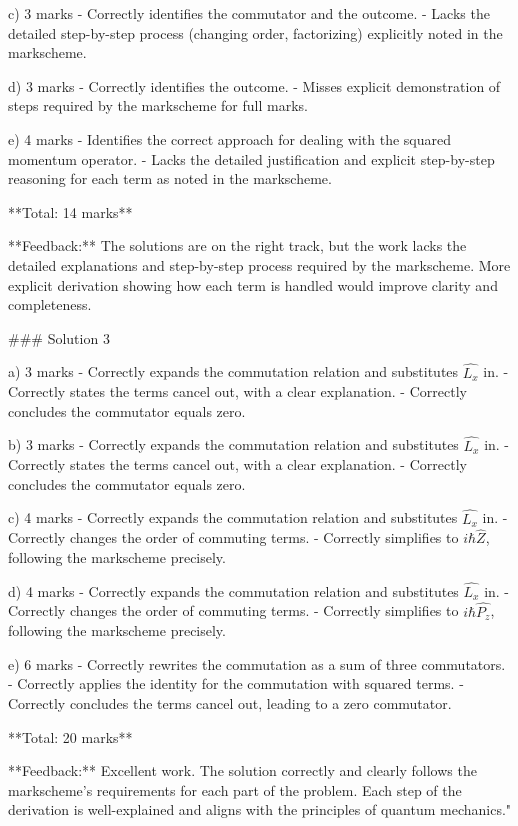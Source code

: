 \documentclass[a4paper,11pt]{article}
\begin{document}
c) 3 marks
- Correctly identifies the commutator and the outcome.
- Lacks the detailed step-by-step process (changing order, factorizing) explicitly noted in the markscheme.

d) 3 marks
- Correctly identifies the outcome.
- Misses explicit demonstration of steps required by the markscheme for full marks.

e) 4 marks
- Identifies the correct approach for dealing with the squared momentum operator.
- Lacks the detailed justification and explicit step-by-step reasoning for each term as noted in the markscheme.

**Total: 14 marks**

**Feedback:** The solutions are on the right track, but the work lacks the detailed explanations and step-by-step process required by the markscheme. More explicit derivation showing how each term is handled would improve clarity and completeness.

### Solution 3

a) 3 marks
- Correctly expands the commutation relation and substitutes \(\hat{L_{x}}\) in.
- Correctly states the terms cancel out, with a clear explanation.
- Correctly concludes the commutator equals zero.

b) 3 marks
- Correctly expands the commutation relation and substitutes \(\hat{L_{x}}\) in.
- Correctly states the terms cancel out, with a clear explanation.
- Correctly concludes the commutator equals zero.

c) 4 marks
- Correctly expands the commutation relation and substitutes \(\hat{L_{x}}\) in.
- Correctly changes the order of commuting terms.
- Correctly simplifies to \(i\hbar\hat{Z}\), following the markscheme precisely.

d) 4 marks
- Correctly expands the commutation relation and substitutes \(\hat{L_{x}}\) in.
- Correctly changes the order of commuting terms.
- Correctly simplifies to \(i\hbar\hat{P_{z}}\), following the markscheme precisely.

e) 6 marks
- Correctly rewrites the commutation as a sum of three commutators.
- Correctly applies the identity for the commutation with squared terms.
- Correctly concludes the terms cancel out, leading to a zero commutator.

**Total: 20 marks**

**Feedback:** Excellent work. The solution correctly and clearly follows the markscheme's requirements for each part of the problem. Each step of the derivation is well-explained and aligns with the principles of quantum mechanics."
\end{document}
